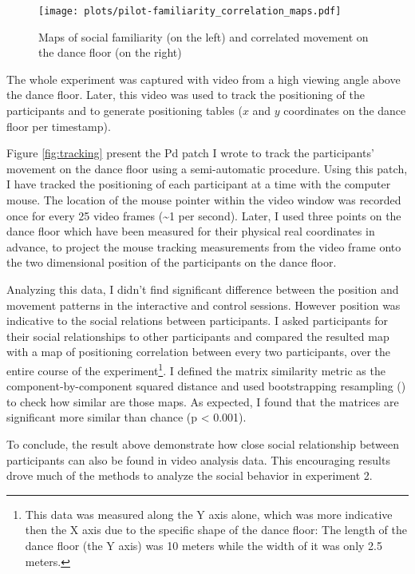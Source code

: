 \documentclass[a4paper,11pt]{article}
\begin{document}
{\begin{figure}[!htb]
    \centering
    \texttt{[image: plots/pilot-familiarity\_correlation\_maps.pdf]}
    \caption{Maps of social familiarity (on the left) and correlated movement on the dance floor (on the right)}\label{plot:pilot-familiarity_correlation_maps}
\end{figure}

The whole experiment was captured with video from a high viewing angle above the dance floor.
Later, this video was used to track the positioning of the participants and to generate positioning tables ($x$ and $y$ coordinates on the dance floor per timestamp).

Figure \ref{fig:tracking} present the Pd patch I wrote to track the participants' movement on the dance floor using a semi-automatic procedure.
Using this patch, I have tracked the positioning of each participant at a time with the computer mouse.
The location of the mouse pointer within the video window was recorded once for every 25 video frames (\textasciitilde{}1 per second).
Later, I used three points on the dance floor which have been measured for their physical real coordinates in advance, to project the mouse tracking measurements from the video frame onto the two dimensional position of the participants on the dance floor.

Analyzing this data, I didn't find significant difference between the position and movement patterns in the interactive and control sessions.
However position was indicative to the social relations between participants.
I asked participants for their social relationships to other participants and compared the resulted map with a map of positioning correlation between every two participants, over the entire course of the experiment\footnote{This data was measured along the Y axis alone, which was more indicative then the X axis due to the specific shape of the dance floor: The length of the dance floor (the Y axis) was 10 meters while the width of it was only 2.5 meters.}.
I defined the matrix similarity metric as the component-by-component squared distance and used bootstrapping resampling (\cite{good2006permutation}) to check how similar are those maps.
As expected, I found that the matrices are significant more similar than chance (p \textless{} 0.001).

To conclude, the result above demonstrate how close social relationship between participants can also be found in video analysis data.
This encouraging results drove much of the methods to analyze the social behavior in experiment 2.

}
\end{document}
